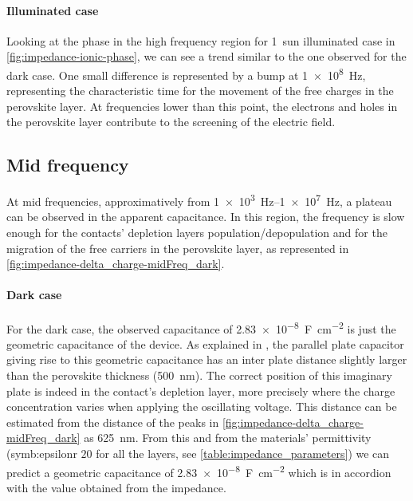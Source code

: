 	\paragraph{Illuminated case}
	Looking at the phase in the high frequency region for \SI{1}{sun} illuminated case in \cref{fig:impedance-ionic-phase}, we can see a trend similar to the one observed for the dark case.
	One small difference is represented by a bump at \SI{1e8}{\Hz}, representing the characteristic time for the movement of the free charges in the perovskite layer.
	At frequencies lower than this point, the electrons and holes in the perovskite layer contribute to the screening of the electric field.




	\subsection{Mid frequency}
	At mid frequencies, approximatively from \SIrange{1e3}{1e7}{\Hz}, a plateau can be observed in the apparent capacitance.
	In this region, the frequency is slow enough for the contacts' depletion layers population/depopulation and for the migration of the free carriers in the perovskite layer, as represented in \cref{fig:impedance-delta_charge-midFreq_dark}.
	
	\paragraph{Dark case}
	For the dark case, the observed capacitance of \SI{2.83e-8}{\farad\per\square\cm} is just the geometric capacitance of the device.
	As explained in , the parallel plate capacitor giving rise to this geometric capacitance has an inter plate distance slightly larger than the perovskite thickness (\SI{500}{\nm}).
	The correct position of this imaginary plate is indeed in the contact's depletion layer, more precisely where the charge concentration varies when applying the oscillating voltage.
	This distance can be estimated from the distance of the peaks in \cref{fig:impedance-delta_charge-midFreq_dark} as \SI{625}{\nm}.
	From this and from the materials' permittivity (\gls{symb:epsilonr} $20$ for all the layers, see \cref{table:impedance_parameters}) we can predict a geometric capacitance of \SI{2.83e-8}{\farad\per\square\cm} which is in accordion with the value obtained from the impedance.
	
